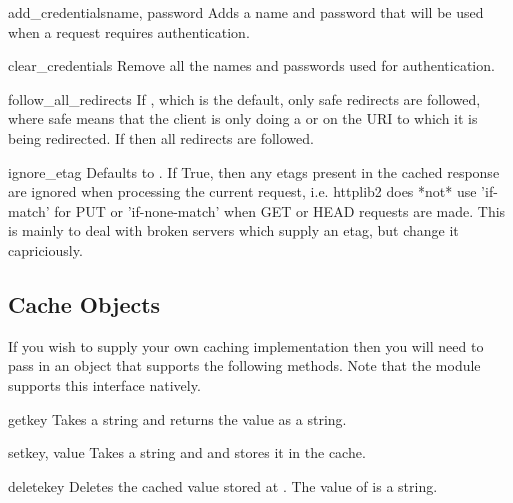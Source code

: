 \begin{methoddesc}[Http]{add_credentials}{name, password}
Adds a name and password that will be used when a request 
requires authentication.
\end{methoddesc}

\begin{methoddesc}[Http]{clear_credentials}{}
Remove all the names and passwords used for authentication.
\end{methoddesc}

\begin{memberdesc}[Http]{follow_all_redirects}
If , which is the default, only safe redirects are followed, where
safe means that the client is only doing a  or  on the
URI to which it is being redirected. If  then all redirects are followed.
\end{memberdesc}

\begin{memberdesc}[Http]{ignore_etag}
Defaults to . If True, then any etags present in the cached response
are ignored when processing the current request, i.e. httplib2 does *not* use
'if-match' for PUT or 'if-none-match' when GET or HEAD requests are made. This
is mainly to deal with broken servers which supply an etag, but change it capriciously.
\end{memberdesc}

\subsection{Cache Objects}
\label{cache-objects}

If you wish to supply your own caching implementation
then you will need to pass in an object that supports the 
following methods. Note that the  module
supports this interface natively.

\begin{methoddesc}[Cache]{get}{key}
Takes a string  and returns the value as a string.
\end{methoddesc}

\begin{methoddesc}[Cache]{set}{key, value}
Takes a string  and  and stores it in the cache.
\end{methoddesc}

\begin{methoddesc}[Cache]{delete}{key}
Deletes the cached value stored at . The value
of  is a string.
\end{methoddesc}





